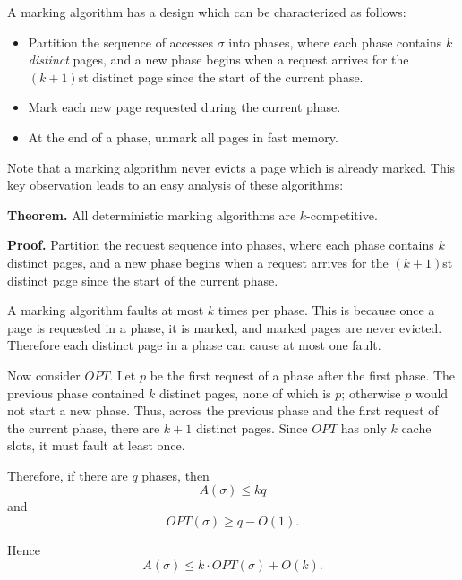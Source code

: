 \documentclass[14pt]{extreport}
\begin{document}
    \vspace{2mm}
    A marking algorithm has a design which can be characterized as follows:
    \begin{itemize}
        \item Partition the sequence of accesses $\sigma$ into phases, where each phase contains $k$ \textit{distinct} pages, and a new phase begins when a request arrives for the $(k+1)$st distinct page since the start of the current phase.
        \item Mark each new page requested during the current phase.
        \item At the end of a phase, unmark all pages in fast memory.
    \end{itemize}
    Note that a marking algorithm never evicts a page which is already marked. This key observation leads to an easy analysis of these algorithms:
    
    \vspace{3mm}
    \textbf{Theorem.} All deterministic marking algorithms are $k$-competitive.

    \vspace{3mm}
    \textbf{Proof.}
    Partition the request sequence into phases, where each phase contains $k$ distinct pages, and a new phase begins when a request arrives for the $(k+1)$st distinct page since the start of the current phase.

    \vspace{2mm}
    A marking algorithm faults at most $k$ times per phase. This is because once a page is requested in a phase, it is marked, and marked pages are never evicted. Therefore each distinct page in a phase can cause at most one fault.

    \vspace{2mm}
    Now consider $OPT$. Let $p$ be the first request of a phase after the first phase. The previous phase contained $k$ distinct pages, none of which is $p$; otherwise $p$ would not start a new phase. Thus, across the previous phase and the first request of the current phase, there are $k+1$ distinct pages. Since $OPT$ has only $k$ cache slots, it must fault at least once.

    \vspace{2mm}
    Therefore, if there are $q$ phases, then
    $$A(\sigma) \le kq$$
    and
    $$OPT(\sigma) \ge q - O(1).$$

    \vspace{2mm}
    Hence
    $$A(\sigma) \le k \cdot OPT(\sigma) + O(k).$$
\end{document}
